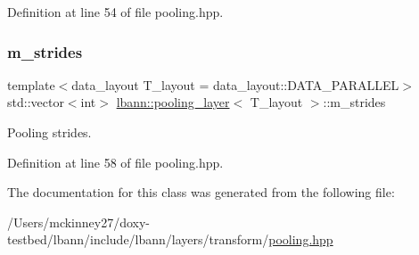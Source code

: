Definition at line 54 of file pooling.\+hpp.

\mbox{\label{classlbann_1_1pooling__layer_a754bb6d49b39e915f315ca0049c953d9}} 
\subsubsection{\texorpdfstring{m\+\_\+strides}{m\_strides}}
{\footnotesize\ttfamily template$<$data\+\_\+layout T\+\_\+layout = data\+\_\+layout\+::\+D\+A\+T\+A\+\_\+\+P\+A\+R\+A\+L\+L\+EL$>$ \\
std\+::vector$<$int$>$ \hyperlink{classlbann_1_1pooling__layer}{lbann\+::pooling\+\_\+layer}$<$ T\+\_\+layout $>$\+::m\+\_\+strides\hspace{0.3cm}{\ttfamily [private]}}



Pooling strides. 



Definition at line 58 of file pooling.\+hpp.



The documentation for this class was generated from the following file\+:\begin{DoxyCompactItemize}
\item 
/\+Users/mckinney27/doxy-\/testbed/lbann/include/lbann/layers/transform/\hyperlink{pooling_8hpp}{pooling.\+hpp}\end{DoxyCompactItemize}
